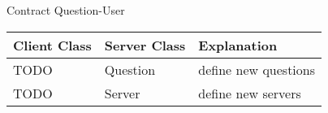 \begin{subsubsection}{Contract Question-User}
	\begin{tabular}{l l l }
	  Client Class & Server Class & Explanation\\ \hline
	  TODO & Question & define new questions\\
	  TODO & Server & define new servers\\
	\end{tabular}
\end{subsubsection}